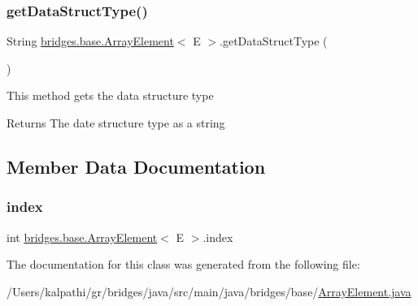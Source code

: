 \subsubsection{\texorpdfstring{getDataStructType()}{getDataStructType()}}
{\footnotesize\ttfamily String \mbox{\hyperlink{classbridges_1_1base_1_1_array_element}{bridges.\+base.\+Array\+Element}}$<$ E $>$.get\+Data\+Struct\+Type (\begin{DoxyParamCaption}{ }\end{DoxyParamCaption})}

This method gets the data structure type

\begin{DoxyReturn}{Returns}
The date structure type as a string 
\end{DoxyReturn}


\subsection{Member Data Documentation}
\mbox{\label{classbridges_1_1base_1_1_array_element_a79c69e5046da8c297026d1e457a23182}} 
\subsubsection{\texorpdfstring{index}{index}}
{\footnotesize\ttfamily int \mbox{\hyperlink{classbridges_1_1base_1_1_array_element}{bridges.\+base.\+Array\+Element}}$<$ E $>$.index\hspace{0.3cm}{\ttfamily [static]}}



The documentation for this class was generated from the following file\+:\begin{DoxyCompactItemize}
\item 
/\+Users/kalpathi/gr/bridges/java/src/main/java/bridges/base/\mbox{\hyperlink{_array_element_8java}{Array\+Element.\+java}}\end{DoxyCompactItemize}

